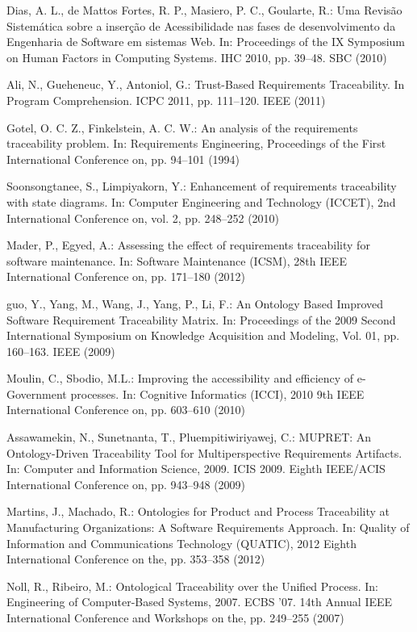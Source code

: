 \documentclass[runningheads,a4paper]{llncs}
\begin{document}
\begin{thebibliography}{4}
 Dias, A. L., de Mattos Fortes, R. P., Masiero, P. C., Goularte, R.: Uma Revisão
Sistemática sobre a inserção de Acessibilidade nas fases de desenvolvimento da Engenharia
de Software em sistemas Web. In: Proceedings of the IX Symposium on Human
Factors in Computing Systems. IHC 2010, pp. 39--48. SBC (2010)

 Ali, N., Gueheneuc, Y., Antoniol, G.: Trust-Based Requirements Traceability.
In Program Comprehension. ICPC 2011, pp. 111--120. IEEE (2011)

 Gotel, O. C. Z., Finkelstein, A. C. W.: An analysis of the requirements traceability
problem. In: Requirements Engineering, Proceedings of the First International
Conference on, pp. 94--101 (1994)

 Soonsongtanee, S., Limpiyakorn, Y.: Enhancement of requirements traceability
with state diagrams. In: Computer Engineering and Technology (ICCET), 2nd International Conference on, vol. 2, pp. 248--252 (2010)

 Mader, P., Egyed, A.: Assessing the effect of requirements traceability for software
maintenance. In: Software Maintenance (ICSM), 28th IEEE International Conference on, pp. 171--180 (2012)

 guo, Y., Yang, M., Wang, J., Yang, P., Li, F.: An Ontology
Based Improved Software Requirement Traceability Matrix. In: Proceedings of the
2009 Second International Symposium on Knowledge Acquisition and Modeling,
Vol. 01, pp. 160--163. IEEE (2009)

 Moulin, C., Sbodio, M.L.: Improving the accessibility and
efficiency of e-Government processes. In: Cognitive Informatics (ICCI), 2010 9th
IEEE International Conference on, pp. 603--610 (2010)

 Assawamekin, N., Sunetnanta, T., Pluempitiwiriyawej, C.: MUPRET: An
Ontology-Driven Traceability Tool for Multiperspective Requirements Artifacts.
In: Computer and Information Science, 2009. ICIS 2009. Eighth IEEE/ACIS
International Conference on, pp. 943--948 (2009)

 Martins, J., Machado, R.: Ontologies for Product and Process
Traceability at Manufacturing Organizations: A Software Requirements Approach.
In: Quality of Information and Communications Technology (QUATIC), 2012 Eighth
International Conference on the, pp. 353--358 (2012)

 Noll, R., Ribeiro, M.: Ontological Traceability over
the Unified Process. In: Engineering of Computer-Based Systems, 2007. ECBS '07.
14th Annual IEEE International Conference and Workshops on the, pp.
249--255 (2007)


\end{thebibliography}
\end{document}
